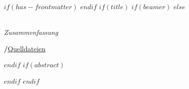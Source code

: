 $if(has-frontmatter)$
\frontmatter
$endif$
$if(title)$ %
$if(beamer)$ %
\frame{\titlepage}
$else$ %

\makeatletter
\begin{center}
  \vspace*{0.5cm}
  
  \textbf{\Huge \@title}\\
  \vspace{0.1cm}
  \textsf{\textit{\large Zusammenfassung}}
  
  \vspace{0.5cm}

  \textsf{\large \@author \hspace{0.3cm}\textbf{/}\hspace{0.3cm}\large \faGithub\space \href{$source.github$}{Quelldateien}}
  

\end{center}
\makeatother

$endif$ %
$if(abstract)$
\begin{abstract}
$abstract$
\end{abstract}
$endif$
$endif$ %

